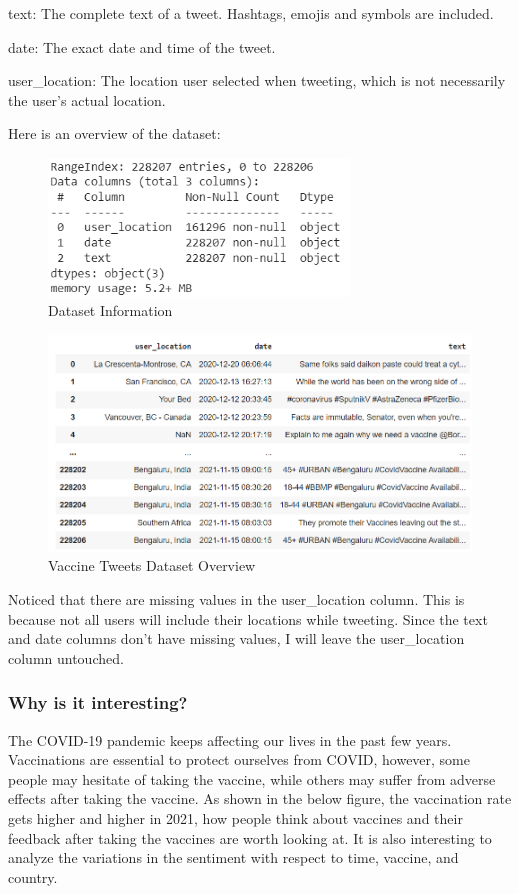 \documentclass{article}
\begin{document}
text: The complete text of a tweet. Hashtags, emojis and symbols are included.

date: The exact date and time of the tweet.

user\_location: The location user selected when tweeting, which is not necessarily the user's actual location.

Here is an overview of the dataset:

\begin{figure}[H]
\centering
\includegraphics[width=8cm]{df2.png}
\caption{Dataset Information}
\end{figure}

\begin{figure}[H]
\centering
\includegraphics[width=15cm]{df.png}
\caption{Vaccine Tweets Dataset Overview}
\end{figure}

Noticed that there are missing values in the user\_location column. This is because not all users will include their locations while tweeting. Since the text and date columns don't have missing values, I will leave the user\_location column untouched.

\subsubsection{Why is it interesting?}
The COVID-19 pandemic keeps affecting our lives in the past few years. Vaccinations are essential to protect ourselves from COVID, however, some people may hesitate of taking the vaccine, while others may suffer from adverse effects after taking the vaccine. As shown in the below figure, the vaccination rate gets higher and higher in 2021, how people think about vaccines and their feedback after taking the vaccines are worth looking at. It is also interesting to analyze the variations in the sentiment with respect to time, vaccine, and country.
\end{document}
